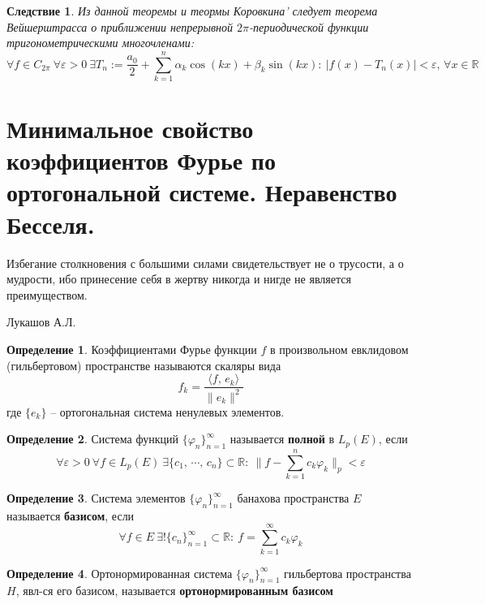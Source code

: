 \documentclass[a4paper,12pt]{article}
\renewcommand{\phi}{\ensuremath{\varphi}}
\theoremstyle{plain}
\newtheorem*{corollary}{Следствие}
\theoremstyle{definition}
\newtheorem{definition}{Определение}[section]
\theoremstyle{remark}
\begin{document}
\begin{corollary}
	Из данной теоремы и теормы Коровкина' следует теорема Вейшерштрасса о приближении непрерывной $2\pi$-периодической функции тригонометрическими многочленами:
	\[\forall f \in C_{2\pi} \: \forall \varepsilon > 0 \: \exists T_n := \frac{a_0}{2} + \sum_{k = 1}^n \alpha_k\cos(kx) + \beta_k\sin(kx) :\: |f(x) - T_n(x)| < \varepsilon,\, \forall x \in \mathbb{R}\]
\end{corollary}

\section{Минимальное свойство коэффициентов Фурье по ортогональной системе. Неравенство Бесселя.}

\epigraph{Избегание столкновения с большими силами свидетельствует не о трусости, а о мудрости, ибо принесение себя в жертву никогда и нигде не является преимуществом.}{Лукашов А.Л.}

\begin{definition}
	Коэффициентами Фурье функции $f$ в произвольном\newline
	евклидовом (гильбертовом) пространстве называются скаляры вида
	\[f_k = \frac{\langle f,\,e_k\rangle}{\|e_k\|^2}\]
	где $\{e_k\}$ -- ортогональная система ненулевых элементов.
\end{definition}

\begin{definition}
	Система функций $\{\phi_n\}_{n = 1}^\infty$ называется \textbf{полной} в $L_p(E)$, если
	\[\forall \varepsilon > 0 \: \forall f \in L_p(E) \: \exists \{c_1,\,\cdots,\,c_n\} \subset \mathbb{R}:\: \|f - \sum_{k = 1}^n c_k\phi_k\|_p < \varepsilon\]
\end{definition}

\begin{definition}
	Система элементов $\{\phi_n\}_{n = 1}^\infty$ банахова пространства $E$ называется \textbf{базисом}, если
	\[\forall f \in E \: \exists! \{c_n\}_{n = 1}^\infty \subset \mathbb{R}:\: f = \sum_{k = 1}^\infty c_k\phi_k\]
\end{definition}

\begin{definition}
	Ортонормированная система $\{\phi_n\}_{n = 1}^\infty$ гильбертова пространства $H$, явл-ся его базисом, называется \textbf{ортонормированным базисом}
\end{definition}
\end{document}
